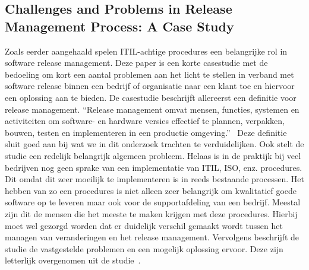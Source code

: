 \subsection{Challenges and Problems in Release Management Process: A Case Study}
Zoals eerder aangehaald spelen ITIL-achtige procedures een belangrijke rol in software release management. Deze paper \autocite{Lahtela2011} is een korte casestudie met de bedoeling om kort een aantal problemen aan het licht te stellen in verband met software release binnen een bedrijf of organisatie naar een klant toe en hiervoor een oplossing aan te bieden.
\newline
\newline
De casestudie \autocite{Lahtela2011} beschrijft allereerst een definitie voor release management. “Release management omvat mensen, functies, systemen en activiteiten om software- en hardware versies effectief te plannen, verpakken, bouwen, testen en implementeren in een productie omgeving.”~\textcite{Lahtela2011} Deze definitie sluit goed aan bij wat we in dit onderzoek trachten te verduidelijken. Ook stelt de studie een redelijk belangrijk algemeen probleem. Helaas is in de praktijk bij veel bedrijven nog geen sprake van een implementatie van ITIL, ISO, enz. procedures. Dit omdat dit zeer moeilijk te implementeren is in reeds bestaande processen. Het hebben van zo een procedures is niet alleen zeer belangrijk om kwalitatief goede software op te leveren maar ook voor de supportafdeling van een bedrijf. Meestal zijn dit de mensen die het meeste te maken krijgen met deze procedures. Hierbij moet wel gezorgd worden dat er duidelijk verschil gemaakt wordt tussen het managen van veranderingen en het release management. Vervolgens beschrijft de studie de vastgestelde problemen en een mogelijk oplossing ervoor. Deze zijn letterlijk overgenomen uit de studie~\textcite{Lahtela2011}.
